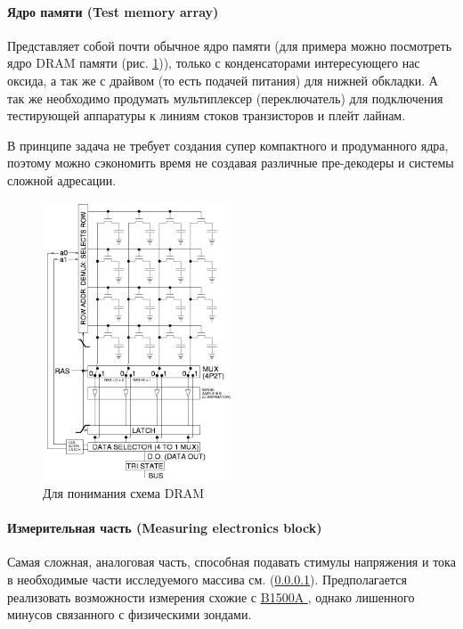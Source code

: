 \documentclass[a4paper,12pt]{article} %
\begin{document}
\paragraph{Ядро памяти (Test memory array)}\label{array}

Представляет собой почти обычное ядро памяти (для примера можно посмотреть ядро DRAM памяти (рис. \ref{DRAM})), только с конденсаторами интересующего нас оксида, а так же с драйвом (то есть подачей питания) для нижней обкладки. А так же необходимо продумать мультиплексер (переключатель) для подключения тестирующей аппаратуры к линиям стоков транзисторов и плейт лайнам.  

В принципе задача не требует создания супер компактного и продуманного ядра, поэтому можно сэкономить время не создавая различные пре-декодеры и системы сложной адресации.

\begin{figure}[h]
\centering
\includegraphics[width=0.5\textwidth]{Square_array_of_mosfet_cells_read.png}
\caption{Для понимания схема DRAM} \label{DRAM}
\end{figure}



\paragraph{Измерительная часть (Measuring electronics block)}

Самая сложная, аналоговая часть, способная подавать стимулы напряжения и тока в необходимые части исследуемого массива см. (\ref{array}). Предполагается реализовать возможности измерения схожие с  \underline{ \href{https://www.keysight.com/ru/ru/assets/7018-01289/data-sheets/5989-2785.pdf}{B1500A} }, однако лишенного минусов связанного с физическими зондами. 
\end{document}
